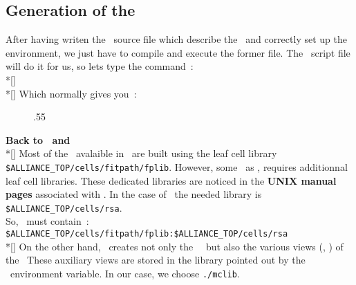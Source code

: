    \subsection{Generation of the \netlist}
   \forceindent
     After having writen the \C\ source file which describe the \netlist\ 
   and correctly set up the environment, we just have to compile and
   execute the former file. The \fpgen\ script file will do it for us,
   so lets type the command~:
   \\*[\bigskipamount]
   \nopagebreak
   \indent
   \\*[\bigskipamount]
   \nopagebreak
   \indent
     Which normally gives you~:%
   \nopagebreak
   \begin{figure}[H]
     \begin{center}
       \leavevmode\epsfxsize.55\textwidth{}
     \end{center}
   \end{figure}
   {\bf Back to \mbkcatalib\ and \fpgenlib}
   \\*[\bigskipamount]
   \nopagebreak
   \indent
     Most of the \operators\ avalaible in \fpgen\ are built using
   the leaf cell library {\tt \$ALLIANCE\_TOP/cells/fitpath/fplib}. However, some
   \operators\, as \DPADDIIF, requires additionnal leaf cell
   libraries. These dedicated libraries are noticed in the {\bf UNIX manual
   pages} associated with \operators. In the case of \DPADDIIF\ the needed
   library is {\tt \$ALLIANCE\_TOP/cells/rsa}.\\
   \nopagebreak
   \indent
     So, \mbkcatalib\ must contain~:\\
   \nopagebreak
   \doubleindent
       {\tt \$ALLIANCE\_TOP/cells/fitpath/fplib:\$ALLIANCE\_TOP/cells/rsa}\\*[\bigskipamount]
   \indent
     On the other hand, \fpgen\ creates not only the \datapath\ \netlist\ but
   also the various views (\layout, \behavioral) of the \operators\
   These auxiliary views are stored in the library pointed out
   by the \fpgenlib\ environment variable. In our case, we choose
   {\tt ./mclib}.
